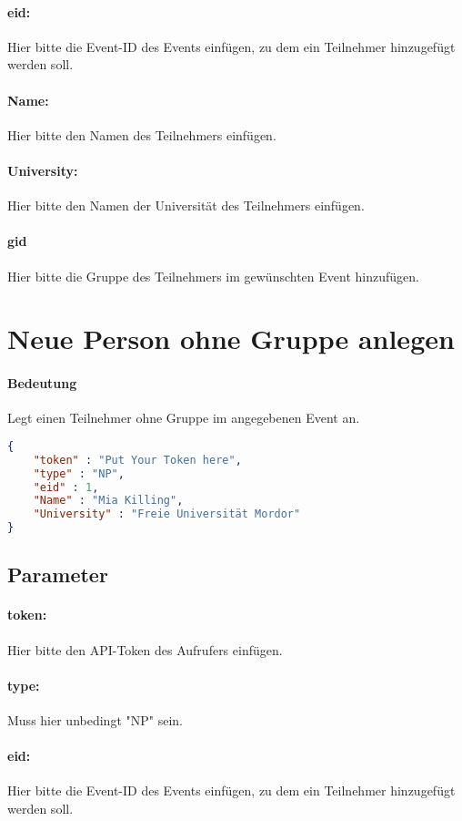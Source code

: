 \documentclass[12pt,parskip=full, pagea4]{scrreprt}
\begin{document}
			\paragraph{eid:}Hier bitte die Event-ID des Events einf\"ugen, zu dem ein Teilnehmer hinzugef\"ugt werden soll.
			\paragraph{Name:}Hier bitte den Namen des Teilnehmers einf\"ugen.
			\paragraph{University:}Hier bitte den Namen der Universit\"at des Teilnehmers einf\"ugen.
			\paragraph{gid}Hier bitte die Gruppe des Teilnehmers im gew\"unschten Event hinzuf\"ugen.

			\section{Neue Person ohne Gruppe anlegen}
			\paragraph{Bedeutung} Legt einen Teilnehmer ohne Gruppe im angegebenen Event an.
			\begin{lstlisting}[language=JSON]
{
	"token" : "Put Your Token here",
	"type" : "NP",
	"eid" : 1,
	"Name" : "Mia Killing",
	"University" : "Freie Universität Mordor"
}
			\end{lstlisting}
			\subsection{Parameter}
			\paragraph{token:}Hier bitte den API-Token des Aufrufers einf\"ugen.
			\paragraph{type:}Muss hier unbedingt "NP" sein.
			\paragraph{eid:}Hier bitte die Event-ID des Events einf\"ugen, zu dem ein Teilnehmer hinzugef\"ugt werden soll.
\end{document}
